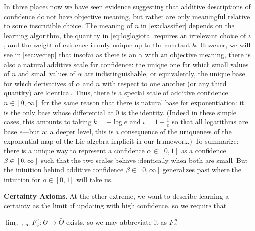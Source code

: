 In three places now we have seen evidence suggesting that 
additive descriptions of confidence do not have objective meaning,
but rather are only meaningful relative to some inscrutible choice.
The meaning of $n$ in \cref{ex:classifier} depends on the learning algorithm,
the quantity in \eqref{eq:loglogiota} requires an irrelevant choice of $\iota$,
and the weight of evidence is only unique up to the constant $k$.
However, we will see in \cref{sec:vecrep} that insofar as there is an 
$\alpha$ with an objective meaning, there is also a natural additive 
scale for confidence: the unique one for which small values of $n$ and 
small values of $\alpha$ are indistinguishable, or equivalently,
the unique base for which derivatives of $\alpha$ and $n$ with respect
to one another (or any third quantity) are identical.
Thus, there is a special scale of additive confidence $n \in [0,\infty]$
for the same reason that there is natural base for exponentiation: 
it is the only base whose differential at 0 is the identity. 
(Indeed in these simple cases, this amounts to taking $k = -\log e$ and $\iota = 1-\frac1e$ so that all logarithms are base $e$---but at a deeper level, this is a consequence of the uniqueness of the exponential map of the Lie algebra implicit in our framework.)
To summarize: there is a unique way to represent a confidence
$\alpha \in [0,1]$ as a confidence $\beta \in [0, \infty]$
such that the two scales behave identically when both are small. 
But the intuition behind additive confidence $\beta \in [0, \infty]$ 
generalizes past where the intuition for $\alpha \in [0,1]$ will take us.




\textbf{Certainty Axioms.}
    At the other extreme, we want to describe learning a certainty as the limit of updating with high confidence, so we require that
    \begin{CFaxioms}
        \item
            $\displaystyle\lim_{c \to \infty} F^{c}_\phi : \Theta \to \bar\Theta$
            exists, so we may abbreviate it as $F^\infty_\phi$
            \label{ax:cert-exists}
    \end{CFaxioms}


